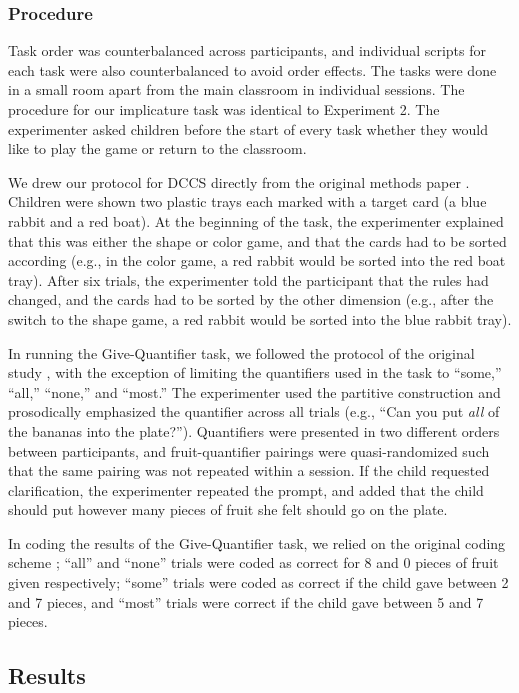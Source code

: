 \documentclass[man]{apa2}
\begin{document}
\subsubsection{Procedure}
Task order was counterbalanced across participants, and individual scripts for each task were also counterbalanced to avoid order effects. The tasks were done in a small room apart from the main classroom in individual sessions. The procedure for our implicature task was identical to Experiment 2. The experimenter asked children before the start of every task whether they would like to play the game or return to the classroom.

We drew our protocol for DCCS directly from the original methods paper \cite{zelazo2006}. Children were shown two plastic trays each marked with a target card (a blue rabbit and a red boat). At the beginning of the task, the experimenter explained that this was either the shape or color game, and that the cards had to be sorted according (e.g., in the color game, a red rabbit would be sorted into the red boat tray). After six trials, the experimenter told the participant that the rules had changed, and the cards had to be sorted by the other dimension (e.g., after the switch to the shape game, a red rabbit would be sorted into the blue rabbit tray).

In running the Give-Quantifier task, we followed the protocol of the original study \cite{barner2009}, with the exception of limiting the quantifiers used in the task to ``some,'' ``all,'' ``none,'' and ``most.'' The experimenter used the partitive construction and prosodically emphasized the quantifier across all trials (e.g., ``Can you put \textit{all} of the bananas into the plate?''). Quantifiers were presented in two different orders between participants, and fruit-quantifier pairings were quasi-randomized such that the same pairing was not repeated within a session. If the child requested clarification, the experimenter repeated the prompt, and added that the child should put however many pieces of fruit she felt should go on the plate.

In coding the results of the Give-Quantifier task, we relied on the original coding scheme \cite{barner2009}; ``all'' and ``none'' trials were coded as correct for 8 and 0 pieces of fruit given respectively; ``some'' trials were coded as correct if the child gave between 2 and 7 pieces, and ``most'' trials were correct if the child gave between 5 and 7 pieces.

\subsection{Results}
\end{document}
